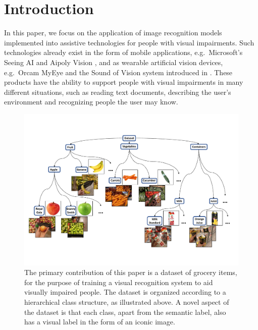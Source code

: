 \section{Introduction}\label{paperA:sec:introduction}

In this paper, we focus on the application of image recognition models implemented into assistive technologies for people with visual impairments. Such technologies already exist in the form of mobile applications, e.g.~Microsoft's Seeing AI  and Aipoly Vision , and as wearable artificial vision devices, e.g.~Orcam MyEye  and the Sound of Vision system introduced in . These products have the ability to support people with visual impairments in many different situations, such as reading text documents, describing the user's environment and recognizing people the user may know. 

\begin{figure}[t]
	\centering
    \includegraphics[width=\columnwidth]{PaperA/figures/intro.pdf}
    \vspace{-2mm}
    \caption{The primary contribution of this paper is a dataset of grocery items, for the purpose of training a visual recognition system to aid visually impaired people. The dataset is organized according to a hierarchical class structure, as illustrated above. A novel aspect of the dataset is that each class, apart from the semantic label, also has a visual label in the form of an iconic image.}
    \label{fig:examples} 
\end{figure}

